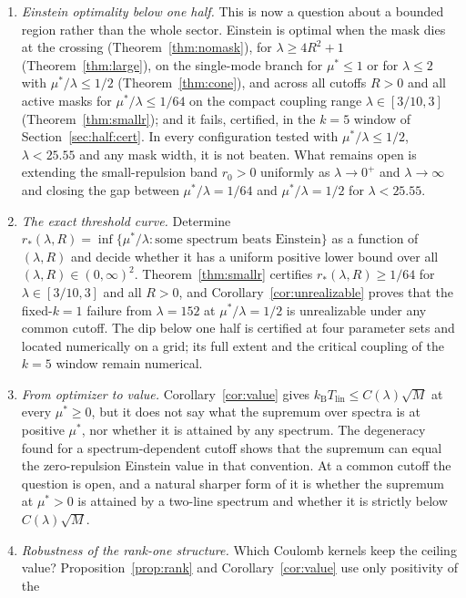 \documentclass[11pt]{article}
\newcommand{\kb}{k_{\mathrm B}}
\newcommand{\Tlin}{T_{\mathrm{lin}}}
\newcommand{\muS}{\mu^{*}}
\theoremstyle{definition}
\theoremstyle{remark}
\begin{document}
\begin{enumerate}[label=(\arabic*),leftmargin=2.2em]
\item \emph{Einstein optimality below one half.} This is now a question about a bounded
region rather than the whole sector. Einstein is optimal when the mask dies at the
crossing (Theorem~\ref{thm:nomask}), for $\lambda\ge4R^2+1$
(Theorem~\ref{thm:large}), on the single-mode branch for $\muS\le1$ or for $\lambda\le2$
with $\muS/\lambda\le1/2$ (Theorem~\ref{thm:cone}), and across all cutoffs $R>0$ and all
active masks for $\muS/\lambda\le1/64$ on the compact coupling range $\lambda\in[3/10,3]$
(Theorem~\ref{thm:smallr}); and it fails, certified, in the $k=5$ window of
Section~\ref{sec:half:cert}. In every configuration tested with $\muS/\lambda\le1/2$,
$\lambda<25.55$ and any mask width, it is not beaten. What remains open is extending the
small-repulsion band $r_0>0$ uniformly as $\lambda\to0^+$ and $\lambda\to\infty$ and
closing the gap between $\muS/\lambda=1/64$ and $\muS/\lambda=1/2$ for $\lambda<25.55$.
\item \emph{The exact threshold curve.} Determine
$r_*(\lambda,R)=\inf\{\muS/\lambda:\text{some spectrum beats Einstein}\}$ as a function of
$(\lambda,R)$ and decide whether it has a uniform positive lower bound over all
$(\lambda,R)\in(0,\infty)^2$. Theorem~\ref{thm:smallr} certifies $r_*(\lambda,R)\ge1/64$
for $\lambda\in[3/10,3]$ and all $R>0$, and Corollary~\ref{cor:unrealizable} proves that the
fixed-$k=1$ failure from $\lambda=152$ at $\muS/\lambda=1/2$ is unrealizable under any
common cutoff. The dip below one half is certified at four parameter sets and located
numerically on a grid; its full extent and the critical coupling of the $k=5$ window remain
numerical.
\item \emph{From optimizer to value.} Corollary~\ref{cor:value} gives
$\kb\Tlin\le C(\lambda)\sqrt M$ at every $\muS\ge0$, but it does not say what the supremum
over spectra is at positive $\muS$, nor whether it is attained by any spectrum. The
degeneracy found for a spectrum-dependent cutoff shows that the supremum can equal the
zero-repulsion Einstein value in that convention. At a common cutoff the question is open,
and a natural sharper form of it is whether the supremum at $\muS>0$ is attained by a
two-line spectrum and whether it is strictly below $C(\lambda)\sqrt M$.
\item \emph{Robustness of the rank-one structure.} Which Coulomb kernels keep the ceiling
value? Proposition~\ref{prop:rank} and Corollary~\ref{cor:value} use only positivity of the

\end{enumerate}
\end{document}

